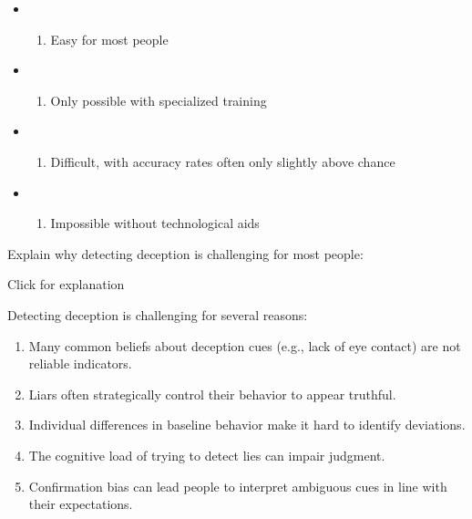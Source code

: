 \documentclass[
  letterpaper,
  DIV=11,
  numbers=noendperiod]{scrreprt}
\providecommand{\tightlist}{%
  \setlength{\itemsep}{0pt}\setlength{\parskip}{0pt}}\usepackage{longtable,booktabs,array}
\begin{document}
\begin{itemize}
\tightlist
\item
  \begin{enumerate}
  \def\labelenumi{(\Alph{enumi})}
  \tightlist
  \item
    Easy for most people\\
  \end{enumerate}
\item
  \begin{enumerate}
  \def\labelenumi{(\Alph{enumi})}
  \setcounter{enumi}{1}
  \tightlist
  \item
    Only possible with specialized training\\
  \end{enumerate}
\item
  \begin{enumerate}
  \def\labelenumi{(\Alph{enumi})}
  \setcounter{enumi}{2}
  \tightlist
  \item
    Difficult, with accuracy rates often only slightly above chance\\
  \end{enumerate}
\item
  \begin{enumerate}
  \def\labelenumi{(\Alph{enumi})}
  \setcounter{enumi}{3}
  \tightlist
  \item
    Impossible without technological aids
  \end{enumerate}
\end{itemize}

Explain why detecting deception is challenging for most people:

Click for explanation

Detecting deception is challenging for several reasons:

\begin{enumerate}
\def\labelenumi{\arabic{enumi}.}
\tightlist
\item
  Many common beliefs about deception cues (e.g., lack of eye contact)
  are not reliable indicators.
\item
  Liars often strategically control their behavior to appear truthful.
\item
  Individual differences in baseline behavior make it hard to identify
  deviations.
\item
  The cognitive load of trying to detect lies can impair judgment.
\item
  Confirmation bias can lead people to interpret ambiguous cues in line
  with their expectations.
\end{enumerate}
\end{document}
